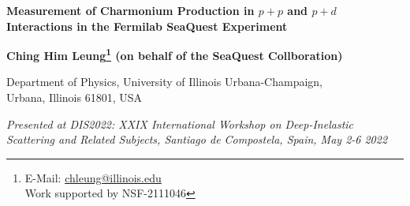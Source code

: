 \documentclass[10pt,a4paper,final]{article}
\begin{document}
\begin{center}
	{\LARGE \bf Measurement of Charmonium Production in $p + p$ and $p + d$ Interactions in the Fermilab SeaQuest Experiment}

	\par\vspace*{2.5mm}\par

	{

		\bigskip

		\large \bf Ching Him Leung\footnote{E-Mail: \href{mailto:chleung@illinois.edu}{chleung@illinois.edu}\\Work supported by NSF-2111046} (on behalf of the SeaQuest Collboration)}

	\vspace*{2.5mm}

	{Department of Physics, University of Illinois Urbana-Champaign, \\Urbana, Illinois 61801, USA}

	\vspace*{2.5mm}

	{\it Presented at DIS2022: XXIX International Workshop on Deep-Inelastic Scattering and Related Subjects, Santiago de Compostela, Spain, May 2-6 2022}


	\vspace*{2.5mm}


\end{center}
\begin{abstract}
	The Fermilab SeaQuest experiment has measured dimuon events from the interactions
	of \SI{120}{\GeV} proton beam on liquid hydrogen and deuterium targets with dimuon
	mass between \num{2} and \SI{9}{\GeV}. These dimuon events contain both the Drell-Yan
	process and the charmonium ($J/\psi$ and $\psi^\prime$) production. Unlike the Drell-Yan process
	which probes the antiquark distributions in the nucleons, the charmonium production
	is sensitive to both quark and gluon distributions. SeaQuest has extracted the
	$\sigma^{pd}/2\sigma^{pp}$ ratio as well as the differential cross sections for
	charmonium production in the kinematic region of $0.4 < x_F < 0.9$. The $\sigma^{pd}/2\sigma^{pp}$
	ratio for charmonium production are found to be significantly different
	from that of the Drell-Yan process. The measured differential cross sections for
	charmonium production are compared with theoretical calculations using Color Evaporation Model
	and Non-Relativistic QCD model.
\end{abstract}
\end{document}
